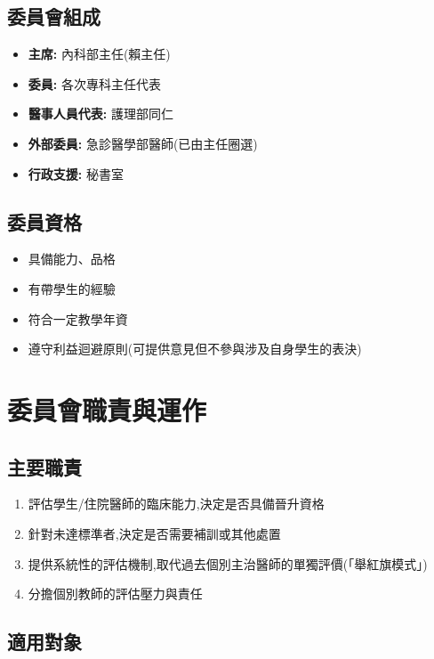 \documentclass[12pt,a4paper]{article}
\begin{document}
\subsection{委員會組成}

\begin{itemize}[leftmargin=*]
    \item \textbf{主席:} 內科部主任(賴主任)
    \item \textbf{委員:} 各次專科主任代表
    \item \textbf{醫事人員代表:} 護理部同仁
    \item \textbf{外部委員:} 急診醫學部醫師(已由主任圈選)
    \item \textbf{行政支援:} 秘書室
\end{itemize}

\subsection{委員資格}

\begin{itemize}[leftmargin=*]
    \item 具備能力、品格
    \item 有帶學生的經驗
    \item 符合一定教學年資
    \item 遵守利益迴避原則(可提供意見但不參與涉及自身學生的表決)
\end{itemize}

\section{委員會職責與運作}

\subsection{主要職責}

\begin{enumerate}[leftmargin=*]
    \item 評估學生/住院醫師的臨床能力,決定是否具備晉升資格
    \item 針對未達標準者,決定是否需要補訓或其他處置
    \item 提供系統性的評估機制,取代過去個別主治醫師的單獨評價(「舉紅旗模式」)
    \item 分擔個別教師的評估壓力與責任
\end{enumerate}

\subsection{適用對象}
\end{document}
